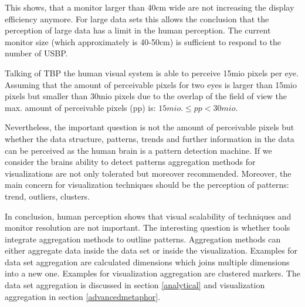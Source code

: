 This shows, that a monitor larger than 40cm wide are not increasing the display efficiency anymore. For large data sets this allows the conclusion that the perception of large data has a limit in the human perception. The current monitor size (which approximately is  40-50cm) is sufficient to respond to the number of USBP.

Talking of TBP  the human visual system is able to perceive 15mio pixels per eye\cite{Deering1998}. Assuming that the amount of perceivable pixels for two eyes is larger than 15mio pixels but smaller than 30mio pixels due to the overlap of the field of view the max. amount of perceivable pixels (pp) is:
\begin{math}
15 mio. \leq pp < 30 mio.
\end{math}

Nevertheless, the important question is not the amount of perceivable pixels but whether the data structure, patterns, trends and further information in the data can be perceived as the human brain is a pattern detection machine\cite{Ware2012a}. If we consider the brains ability to detect patterns aggregation methods for visualizations are not only tolerated but moreover recommended. Moreover, the main concern for visualization techniques should be the perception of patterns: trend, outliers, clusters. 
\par
In conclusion, human perception shows that visual scalability of techniques and monitor resolution are not important. The interesting question is whether tools integrate aggregation methods to outline patterns. \label{pattern}
Aggregation methods can either aggregate data inside the data set or inside the visualization. Examples for data set aggregation are calculated dimensions which joins multiple dimensions into a new one. Examples for visualization aggregation are clustered markers. The data set aggregation is discussed in section \ref{analytical} and visualization aggregation in section \ref{advancedmetaphor}.

